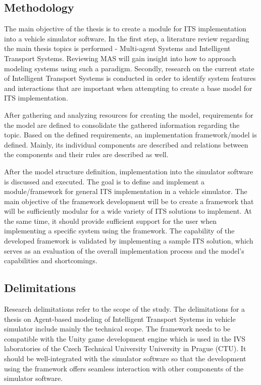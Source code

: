\documentclass[titlepage, 12pt]{article}
\begin{document}

\subsection{Methodology}

The main objective of the thesis is to create a module for ITS implementation into a vehicle simulator software. 
In the first step, a literature review regarding the main thesis topics is performed - Multi-agent Systems and 
Intelligent Transport Systems. Reviewing MAS will gain insight into how to approach modeling systems using 
such a paradigm. Secondly, research on the current state of Intelligent Transport Systems is conducted in 
order to identify system features and interactions that are important when attempting to create a 
base model for ITS implementation. 

After gathering and analyzing resources for creating the model, requirements for the model are defined to consolidate 
the gathered information regarding the topic. Based on the defined requirements, an implementation framework/model is 
defined. Mainly, its individual components are described and relations between the components and their rules are 
described as well. 

After the model structure definition, implementation into the simulator software is discussed and executed. 
The goal is to define and implement a module/framework for general ITS implementation in a vehicle simulator. 
The main objective of the framework development will be to create a framework that will be sufficiently modular for 
a wide variety of ITS solutions to implement. At the same time, it should provide sufficient support for the user when 
implementing a specific system using the framework. The capability of the developed framework is validated
by implementing a sample ITS solution, which serves as an evaluation of the overall implementation process and the 
model's capabilities and shortcomings.

\subsection{Delimitations}

Research delimitations refer to the scope of the study. The delimitations for a thesis on
Agent-based modeling of Intelligent Transport Systems in vehicle simulator include mainly the
technical scope. The framework needs to be compatible with the Unity game development
engine which is used in the IVS laboratories of the Czech Technical University University in
Prague (CTU). It should be well-integrated with the simulator software so that the development
using the framework offers seamless interaction with other components of the simulator
software. 
\end{document}
